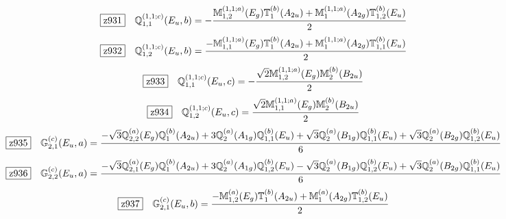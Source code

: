 \documentclass[fleqn,10pt,landscape]{jsarticle}
\begin{document}
\begin{dmath*}
\hspace*{3mm}\fbox{z931}\quad \mathbb{Q}_{1,1}^{(1,1;c)}(E_{u},b)=- \frac{\mathbb{M}_{1,2}^{(1,1;a)}(E_{g}) \mathbb{T}_{1}^{(b)}(A_{2u}) + \mathbb{M}_{1}^{(1,1;a)}(A_{2g}) \mathbb{T}_{1,2}^{(b)}(E_{u})}{2}
\end{dmath*}
\begin{dmath*}
\hspace*{3mm}\fbox{z932}\quad \mathbb{Q}_{1,2}^{(1,1;c)}(E_{u},b)=\frac{- \mathbb{M}_{1,1}^{(1,1;a)}(E_{g}) \mathbb{T}_{1}^{(b)}(A_{2u}) + \mathbb{M}_{1}^{(1,1;a)}(A_{2g}) \mathbb{T}_{1,1}^{(b)}(E_{u})}{2}
\end{dmath*}
\begin{dmath*}
\hspace*{3mm}\fbox{z933}\quad \mathbb{Q}_{1,1}^{(1,1;c)}(E_{u},c)=- \frac{\sqrt{2} \mathbb{M}_{1,2}^{(1,1;a)}(E_{g}) \mathbb{M}_{2}^{(b)}(B_{2u})}{2}
\end{dmath*}
\begin{dmath*}
\hspace*{3mm}\fbox{z934}\quad \mathbb{Q}_{1,2}^{(1,1;c)}(E_{u},c)=\frac{\sqrt{2} \mathbb{M}_{1,1}^{(1,1;a)}(E_{g}) \mathbb{M}_{2}^{(b)}(B_{2u})}{2}
\end{dmath*}
\begin{dmath*}
\hspace*{3mm}\fbox{z935}\quad \mathbb{G}_{2,1}^{(c)}(E_{u},a)=\frac{- \sqrt{3} \mathbb{Q}_{2,2}^{(a)}(E_{g}) \mathbb{Q}_{1}^{(b)}(A_{2u}) + 3 \mathbb{Q}_{2}^{(a)}(A_{1g}) \mathbb{Q}_{1,1}^{(b)}(E_{u}) + \sqrt{3} \mathbb{Q}_{2}^{(a)}(B_{1g}) \mathbb{Q}_{1,1}^{(b)}(E_{u}) + \sqrt{3} \mathbb{Q}_{2}^{(a)}(B_{2g}) \mathbb{Q}_{1,2}^{(b)}(E_{u})}{6}
\end{dmath*}
\begin{dmath*}
\hspace*{3mm}\fbox{z936}\quad \mathbb{G}_{2,2}^{(c)}(E_{u},a)=\frac{- \sqrt{3} \mathbb{Q}_{2,1}^{(a)}(E_{g}) \mathbb{Q}_{1}^{(b)}(A_{2u}) + 3 \mathbb{Q}_{2}^{(a)}(A_{1g}) \mathbb{Q}_{1,2}^{(b)}(E_{u}) - \sqrt{3} \mathbb{Q}_{2}^{(a)}(B_{1g}) \mathbb{Q}_{1,2}^{(b)}(E_{u}) + \sqrt{3} \mathbb{Q}_{2}^{(a)}(B_{2g}) \mathbb{Q}_{1,1}^{(b)}(E_{u})}{6}
\end{dmath*}
\begin{dmath*}
\hspace*{3mm}\fbox{z937}\quad \mathbb{G}_{2,1}^{(c)}(E_{u},b)=\frac{- \mathbb{M}_{1,2}^{(a)}(E_{g}) \mathbb{T}_{1}^{(b)}(A_{2u}) + \mathbb{M}_{1}^{(a)}(A_{2g}) \mathbb{T}_{1,2}^{(b)}(E_{u})}{2}
\end{dmath*}
\end{document}
